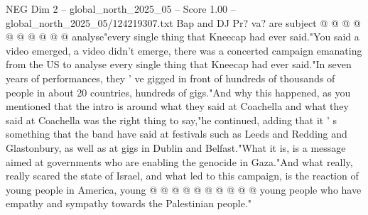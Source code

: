 \begin{textsample}{NEG Dim 2 – global\_north\_2025\_05 – Score 1.00 – global\_north\_2025\_05/124219307.txt}
Bap and DJ Pr? va? are subject @ @ @ @ @ @ @ @ @ @ analyse"every single thing that Kneecap had ever said."You said a video emerged, a video didn't emerge, there was a concerted campaign emanating from the US to analyse every single thing that Kneecap had ever said."In seven years of performances, they ' ve gigged in front of hundreds of thousands of people in about 20 countries, hundreds of gigs."And why this happened, as you mentioned that the intro is around what they said at Coachella and what they said at Coachella was the right thing to say,"he continued, adding that it ' s something that the band have said at festivals such as Leeds and Redding and Glastonbury, as well as at gigs in Dublin and Belfast."What it is, is a message aimed at governments who are enabling the genocide in Gaza."And what really, really scared the state of Israel, and what led to this campaign, is the reaction of young people in America, young @ @ @ @ @ @ @ @ @ @ young people who have empathy and sympathy towards the Palestinian people."

\end{textsample}
